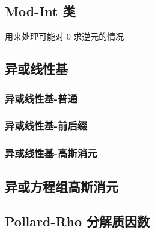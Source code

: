 \documentclass[12pt]{article}
\theoremstyle{definition}
\theoremstyle{remark}
\begin{document}
\newpage

\subsection{Mod-Int 类}

用来处理可能对 0 求逆元的情况



\newpage

\subsection{异或线性基}

\subsubsection{异或线性基-普通}



\newpage

\subsubsection{异或线性基-前后缀}



\newpage

\subsubsection{异或线性基-高斯消元}



\newpage

\subsection{异或方程组高斯消元}



\newpage

\subsection{Pollard-Rho 分解质因数}


\end{document}
